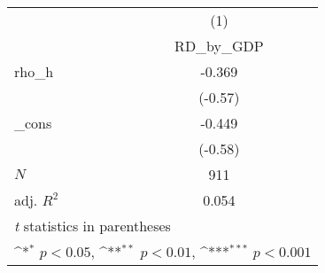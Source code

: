 {
\def\sym#1{\ifmmode^{#1}\else\(^{#1}\)\fi}
\begin{tabular}{l*{1}{c}}
\toprule
            &\multicolumn{1}{c}{(1)}\\
            &\multicolumn{1}{c}{RD\_by\_GDP}\\
\midrule
rho\_h       &      -0.369         \\
            &     (-0.57)         \\
\addlinespace
\_cons      &      -0.449         \\
            &     (-0.58)         \\
\midrule
\(N\)       &         911         \\
adj. \(R^{2}\)&       0.054         \\
\bottomrule
\multicolumn{2}{l}{\footnotesize \textit{t} statistics in parentheses}\\
\multicolumn{2}{l}{\footnotesize \sym{*} \(p<0.05\), \sym{**} \(p<0.01\), \sym{***} \(p<0.001\)}\\
\end{tabular}
}

